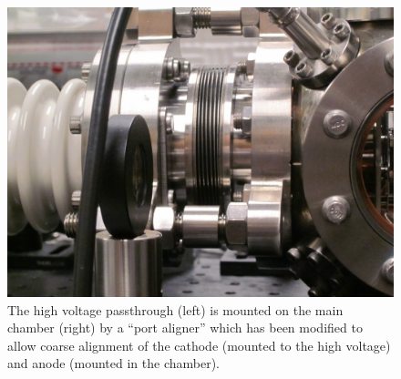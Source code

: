 \begin{figure}
  \centering
  \includegraphics{aligner.jpg}
  \caption[Picture of the high-voltage side of the prototype UEM]{
    The high voltage passthrough (left) is mounted on the main chamber (right) by a ``port aligner'' which has been modified to allow coarse alignment of the cathode (mounted to the high voltage) and anode (mounted in the chamber).
  }
  \label{fig:aligner-pic}
\end{figure}



